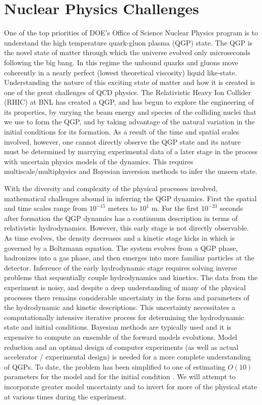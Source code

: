 \documentclass[11pt]{article}
\begin{document}
\section{Nuclear Physics Challenges}
 
One of the top priorities of DOE's Office of Science Nuclear Physics
program is to understand the high temperature quark-gluon plasma (QGP)
state.  The QGP is the novel state of matter through which the
universe evolved only microseconds following the big bang.  In this
regime the unbound quarks and gluons move coherently in a nearly
perfect (lowest theoretical viscosity) liquid like-state.
Understanding the nature of this exciting state of matter and how it
is created is one of the great challenges of QCD physics.  The
Relativistic Heavy Ion Collider (RHIC) at BNL has created a QGP, and 
has begun to explore the engineering of its properties, by varying 
the beam energy and species of the colliding nuclei that we use to 
form the QGP, and by taking advantage of the natural
variation in the initial conditions for its formation.  As a
result of the time and spatial scales involved, however, one cannot
directly observe the QGP state and its nature must be determined by
marrying experimental data of a later stage in the process with
uncertain physics models of the dynamics.  This requires
multiscale/multiphysics and Bayesian inversion methods to infer the
unseen state.  

 With the diversity
and complexity of the physical processes involved, mathematical
challenges abound in inferring the QGP dynamics.  First the spatial
and time scales range from $10^{-15}$ meters to $10^{1}$ m.  For the
first $10^{-23}$ seconds after formation the QGP dynamics has a
continuum description in terms of relativistic hydrodynamics.
However, this early stage is not directly observable.  As time
evolves, the density decreases and a kinetic stage kicks in which is
governed by a Boltzmann equation.  The system evolves from a QGP
phase, hadronizes into a gas phase, and then emerges into more
familiar particles at the detector.  Inference of the early
hydrodynamic stage requires solving inverse problems that sequentially
couple hydrodynamics and kinetics.  The data from the experiment is
noisy, and despite a deep understanding of many of the physical
processes there remains considerable uncertainty in the form and
parameters of the hydrodynamic and kinetic descriptions.  This
uncertainty necessitates a computationally intensive iterative process
for determining the hydrodynamic state and initial conditions.
Bayesian methods are typically used and it is expensive to compute an
ensemble of the forward models evolutions.  Model reduction and an
optimal design of computer experiments (as well as actual accelerator
/ experimental design) is needed for a more complete understanding of
QGPs. To date, the problem has been simplified to one of estimating
$O(10)$ parameters for the model and for the initial
condition \cite{bernhard2016applying, bernhard2015quantifying,
auvinen2016systematic, bernhard2017characterization,
bass2017determination}.  We will attempt to incorporate greater model
uncertainty and to invert for more of the physical state at various
times during the experiment.
\end{document}

